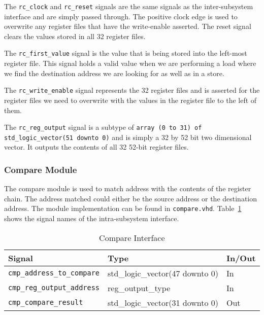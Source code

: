 \documentclass{article}
\begin{document}
The \texttt{rc\_clock} and \texttt{rc\_reset} signals are the same signals as the inter-subsystem interface and are simply passed through. The positive clock edge is used to overwrite any register files that have the write-enable asserted. The reset signal clears the values stored in all 32 register files.

The \texttt{rc\_first\_value} signal is the value that is being stored into the left-most register file. This signal holds a valid value when we are performing a load where we find the destination address we are looking for as well as in a store. 

The \texttt{rc\_write\_enable} signal represents the 32 register files and is asserted for the register files we need to overwrite with the values in the register file to the left of them. 

The \texttt{rc\_reg\_output} signal is a subtype of \texttt{array (0 to 31) of std\_logic\_vector(51 downto 0)} and is simply a 32 by 52 bit two dimensional vector. It outputs the contents of all 32 52-bit register files.

\subsubsection{Compare Module}

The compare module is used to match address with the contents of the register chain. The address matched could either be the source address or the destination address. The module implementation can be found in \texttt{compare.vhd}. Table~\ref{tab:compare} shows the signal names of the intra-subsystem interface. 


\begin{table}[ht]
    \begin{center}
        \begin{tabular}{lll}\hline
        Signal & Type & In/Out \\
        \hline
        \texttt{cmp\_address\_to\_compare} & std\_logic\_vector(47 downto 0) & In \\
        \hline
        \texttt{cmp\_reg\_output\_address} & reg\_output\_type & In \\
        \hline
        \texttt{cmp\_compare\_result} & std\_logic\_vector(31 downto 0) & Out \\
        \hline
        \end{tabular}
        \caption{Compare Interface}\label{tab:compare}
    \end{center}
\end{table}
\end{document}
